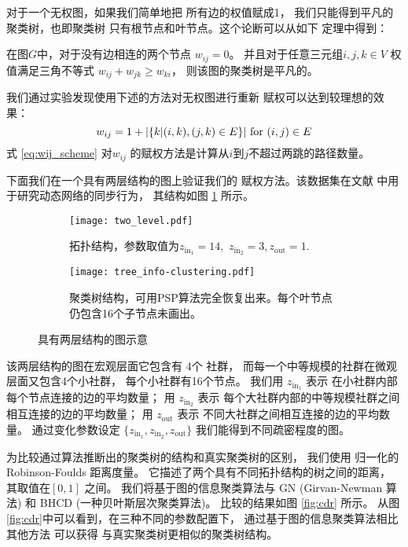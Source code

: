 对于一个无权图，如果我们简单地把
所有边的权值赋成1，
我们只能得到平凡的聚类树，也即聚类树
只有根节点和叶节点。这个论断可以从如下
定理中得到：
\begin{theorem}\label{thm:triangle}
  在图$G$中，对于没有边相连的两个节点 $w_{ij}=0$。
  并且对于任意三元组$i,j,k \in V$ 权值满足三角不等式 
  $w_{ij} + w_{jk} \geq w_{ki}$，
  则该图的聚类树是平凡的。
\end{theorem}
  
我们通过实验发现使用下述的方法对无权图进行重新
赋权可以达到较理想的效果：
\begin{equation}\label{eq:wij_scheme}
    w_{ij} = 1 + \lvert\{k | (i,k),(j,k) \in E \}\rvert \textrm{ for } (i,j) \in E
\end{equation}
式 \ref{eq:wij_scheme} 对$w_{ij}$
的赋权方法是计算从$i$到$j$不超过两跳的路径数量。

下面我们在一个具有两层结构的图上验证我们的
赋权方法。该数据集在文献
\cite{RN22} 中用于研究动态网络的同步行为，
其结构如图 \ref{fig:c1} 所示。 

\begin{figure}
	\centering
	\begin{subfigure}{0.45\textwidth}
		\texttt{[image: two\_level.pdf]}
		\caption{拓扑结构，参数取值为$z_{\mathrm{in}_1} = 14,$ $z_{\mathrm{in}_2} = 3, z_{\mathrm{out}}=1$.}\label{fig:c1}
	\end{subfigure}
	\begin{subfigure}{0.45\textwidth}
		\texttt{[image: tree\_info-clustering.pdf]}
		\caption{聚类树结构，可用PSP算法完全恢复出来。每个叶节点仍包含16个子节点未画出。}
    \label{fig:c2}
	\end{subfigure}
	\caption{具有两层结构的图示意}
\end{figure}

该两层结构的图在宏观层面它包含有 4个 社群，
而每一个中等规模的社群在微观层面又包含4个小社群，
每个小社群有16个节点。
我们用 $z_{\mathrm{in}_1}$ 表示
在小社群内部每个节点连接的边的平均数量；
用 $z_{\mathrm{in}_2}$ 表示
每个大社群内部的中等规模社群之间相互连接的边的平均数量；
用 $z_{\mathrm{out}}$ 表示
不同大社群之间相互连接的边的平均数量。
通过变化参数设定 $\{z_{\mathrm{in}_1}, z_{\mathrm{in}_2}, z_{\mathrm{out}} \}$
我们能得到不同疏密程度的图。

为比较通过算法推断出的聚类树的结构和真实聚类树的区别，
我们使用 归一化的 Robinson-Foulds 距离度量。
它描述了两个具有不同拓扑结构的树之间的距离，
其取值在$[0,1]$ 之间。
我们将基于图的信息聚类算法与
GN (Girvan-Newman 算法) 和 BHCD (一种贝叶斯层次聚类算法\cite{RN23})。
比较的结果如图 \ref{fig:cdr} 所示。
从图 \ref{fig:cdr}中可以看到，在三种不同的参数配置下，
通过基于图的信息聚类算法相比其他方法 可以获得
与真实聚类树更相似的聚类树结构。


